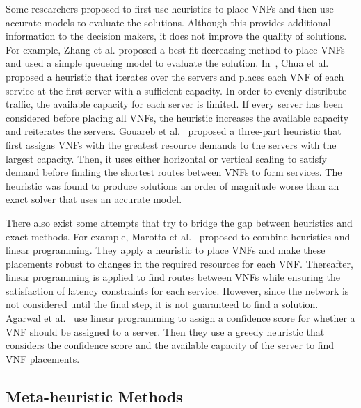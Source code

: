 Some researchers proposed to first use heuristics to place VNFs and then use accurate models to evaluate the solutions. Although this provides additional information to the decision makers, it does not improve the quality of solutions. For example, Zhang et al. \cite{ZhangXLLGW17} proposed a best fit decreasing method to place VNFs and used a simple queueing model to evaluate the solution. In~\cite{ChuaWZSH16}, Chua et al. proposed a heuristic that iterates over the servers and places each VNF of each service at the first server with a sufficient capacity. In order to evenly distribute traffic, the available capacity for each server is limited. If every server has been considered before placing all VNFs, the heuristic increases the available capacity and reiterates the servers. Gouareb et al.~\cite{GouarebFA18} proposed a three-part heuristic that first assigns VNFs with the greatest resource demands to the servers with the largest capacity. Then, it uses either horizontal or vertical scaling to satisfy demand before finding the shortest routes between VNFs to form services. The heuristic was found to produce solutions an order of magnitude worse than an exact solver that uses an accurate model.

There also exist some attempts that try to bridge the gap between heuristics and exact methods. For example, Marotta et al.~\cite{MarottaZDK17} proposed to combine heuristics and linear programming. They apply a heuristic to place VNFs and make these placements robust to changes in the required resources for each VNF. Thereafter, linear programming is applied to find routes between VNFs while ensuring the satisfaction of latency constraints for each service. However, since the network is not considered until the final step, it is not guaranteed to find a solution. Agarwal et al.~\cite{AgarwalMCD18} use linear programming to assign a confidence score for whether a VNF should be assigned to a server. Then they use a greedy heuristic that considers the confidence score and the available capacity of the server to find VNF placements.

\subsection{Meta-heuristic Methods}
\label{sec:meta-heuristics}

